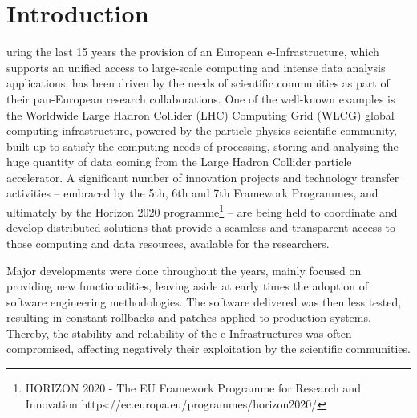 \documentclass[journal]{IEEEtran}
\begin{document}
\IEEEpeerreviewmaketitle

\section{Introduction}



uring the last 15 years the provision of an European e-Infrastructure,
which supports an unified access to large-scale computing and intense data analysis
applications, has been driven by the needs of scientific communities as part of their
pan-European research collaborations. One of the well-known examples is the Worldwide 
Large Hadron Collider (LHC) Computing Grid (WLCG) global computing infrastructure, powered 
by the particle physics scientific community, built up to satisfy the computing needs
of processing, storing and analysing the huge quantity of data coming from the Large 
Hadron Collider particle accelerator. A significant number of innovation projects and
technology transfer activities -- embraced by the 5th, 6th and 7th Framework Programmes,
and ultimately by the Horizon 2020 programme\footnote{HORIZON 2020 - The EU Framework
Programme for Research and Innovation https://ec.europa.eu/programmes/horizon2020/} -- are being held to coordinate and 
develop distributed solutions that provide a seamless and transparent access to those
computing and data resources, available for the researchers.

Major developments were done throughout the years, mainly focused on providing new
functionalities, leaving aside at early times the adoption of software engineering methodologies.
The software delivered was then less tested, resulting in constant
rollbacks and patches applied to production systems. Thereby, the stability and
reliability of the e-Infrastructures was often compromised, affecting
negatively their exploitation by the scientific communities.
\end{document}
